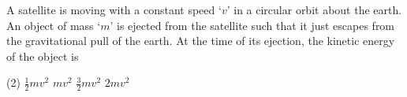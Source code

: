 
\item A satellite is moving with a constant speed `$v$' in a circular orbit about the earth. An object of mass `$m$' is ejected from the satellite such that it just escapes from the gravitational pull of the earth. At the time of its ejection, the kinetic energy of the object is
    \begin{tasks}(2)
        \task $\frac{1}{2}mv^2$
        \task $mv^2$\ans
        \task $\frac{3}{2}mv^2$
        \task $2mv^2$
    \end{tasks}
